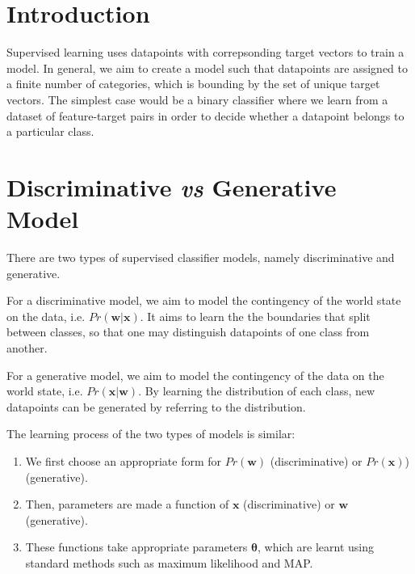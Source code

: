 \documentclass[11pt,openright,a4paper]{article}
\numberwithin{equation}{section}
\begin{document}


\section{Introduction} \label{sec:intro}
Supervised learning uses datapoints with correpsonding target vectors to train a model. In general, we aim to create a model such that datapoints are assigned to a finite number of categories, which is bounding by the set of unique target vectors. The simplest case would be a binary classifier where we learn from a dataset of feature-target pairs in order to decide whether a datapoint belongs to a particular class.

\section{Discriminative \textit{vs} Generative Model} \label{sec:types}
There are two types of supervised classifier models, namely discriminative and generative.

For a discriminative model, we aim to model the contingency of the world state on the data, i.e. $Pr\left(\mathbf{w} | \mathbf{x}\right)$. It aims to learn the the boundaries that split between classes, so that one may distinguish datapoints of one class from another.

For a generative model, we aim to model the contingency of the data on the world state, i.e. $Pr \left(\mathbf{x} | \mathbf{w} \right)$. By learning the distribution of each class, new datapoints can be generated by referring to the distribution.

The learning process of the two types of models is similar:
\begin{enumerate}
    \item We first choose an appropriate form for $Pr(\mathbf{w})$ (discriminative) or $Pr(\mathbf{x})$) (generative). 
    \item Then, parameters are made a function of $\mathbf{x}$ (discriminative) or $\mathbf{w}$ (generative). 
    \item These functions take appropriate parameters $\boldsymbol{\theta}$, which are learnt using standard methods such as maximum likelihood and MAP. 
\end{enumerate}
\end{document}
